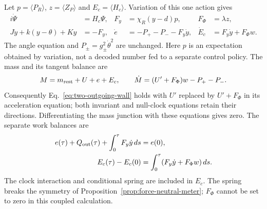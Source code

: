 Let $p=\langle P_R\rangle$, $z=\langle Z_P\rangle$ and
$E_c=\langle H_c\rangle$. Variation of this one action gives
\begin{align}\label{eq:record-spring-work}
 i\dot\Psi&=H_c\Psi,& F_y&=\chi_R(y-d)p,& F_\Phi&=\lambda z,\\
 J\ddot y+k(y-\theta)+Ky&=-F_y,&
 \dot e&=-P_+-P_--F_y\dot y,&
 \dot E_c&=F_y\dot y+F_\Phi w.\nonumber
\end{align}
The angle equation and $P_\pm=g_\pm^2\dot\theta^2$ are unchanged.
Here $p$ is an expectation obtained by variation, not a decoded number
fed to a separate control policy. The mass and its tangent balance are
\begin{equation}\label{eq:record-spring-mass}
 M=m_{\rm rest}+U+e+E_c,\qquad
 \dot M=(U'+F_\Phi)w-P_+-P_- .
\end{equation}
Consequently Eq.~\eqref{eq:two-outgoing-wall} holds with $U'$ replaced
by $U'+F_\Phi$ in its acceleration equation; both invariant and null-clock
equations retain their directions. Differentiating the mass junction
with these equations gives zero. The separate work balances are
\begin{align}\label{eq:record-spring-ledgers}
 e(\tau)+Q_{\rm out}(\tau)+\int_0^\tau F_y\dot y\,ds&=e(0),\\
 E_c(\tau)-E_c(0)&=\int_0^\tau(F_y\dot y+F_\Phi w)\,ds.\nonumber
\end{align}
The clock interaction and conditional spring are included in $E_c$.
The spring breaks the symmetry of Proposition~\ref{prop:force-neutral-meter}; $F_\Phi$ cannot
be set to zero in this coupled calculation.

